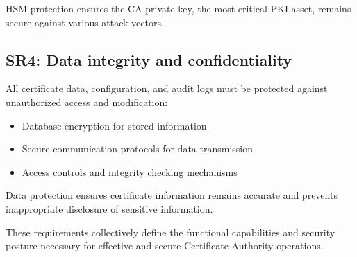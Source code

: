 HSM protection ensures the CA private key, the most critical PKI asset, 
remains secure against various attack vectors.

\subsection{SR4: Data integrity and confidentiality}

All certificate data, configuration, and audit logs must be protected against 
unauthorized access and modification:

\begin{itemize}
    \item Database encryption for stored information
    \item Secure communication protocols for data transmission
    \item Access controls and integrity checking mechanisms
\end{itemize}

Data protection ensures certificate information remains accurate and prevents 
inappropriate disclosure of sensitive information.

These requirements collectively define the functional capabilities and security 
posture necessary for effective and secure Certificate Authority operations.